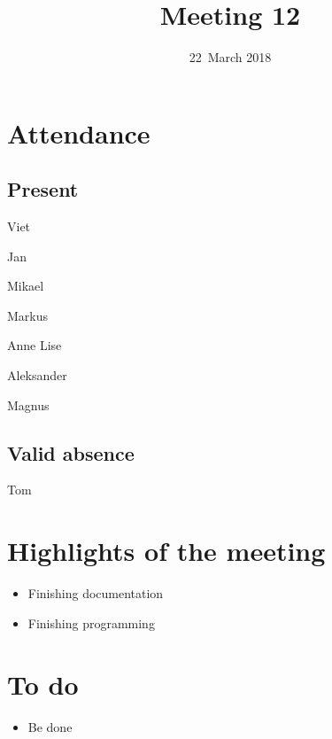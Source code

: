 \documentclass[letterpaper,11pt]{article}
\title{Meeting 12}
\date{22~March 2018}
\begin{document}
\maketitle
\section*{Attendance}
\subsection*{Present}
\begin{list}{}{}
	\item Viet
	\item Jan
	\item Mikael
	\item Markus
	\item Anne Lise
	\item Aleksander
	\item Magnus
\end{list}

\subsection*{Valid absence}
\begin{list}{}{}
	\item Tom
\end{list}

\newpage
\section*{Highlights of the meeting}
\begin{itemize}
	\item Finishing documentation
	\item Finishing programming
\end{itemize}

\section*{To do}
\begin{itemize}
	\item Be done
\end{itemize}
\end{document}
